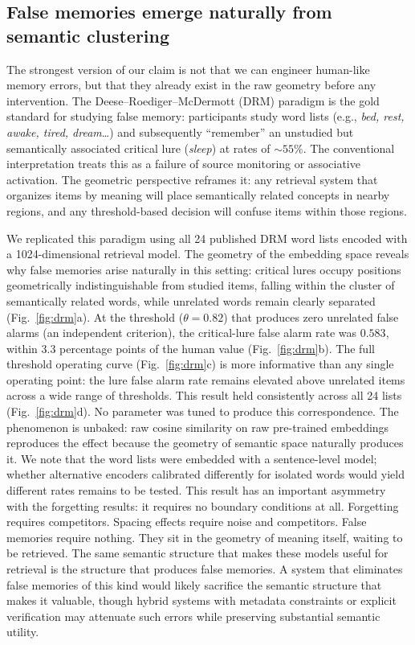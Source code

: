 \documentclass[11pt]{article}
\begin{document}
\subsection*{False memories emerge naturally from semantic clustering}

The strongest version of our claim is not that we can engineer human-like memory errors, but that they already exist in the raw geometry before any intervention. The Deese--Roediger--McDermott (DRM) paradigm\cite{roediger1995} is the gold standard for studying false memory: participants study word lists (e.g., \emph{bed, rest, awake, tired, dream}\ldots) and subsequently ``remember'' an unstudied but semantically associated critical lure (\emph{sleep}) at rates of ${\sim}55\%$. The conventional interpretation treats this as a failure of source monitoring or associative activation. The geometric perspective reframes it: any retrieval system that organizes items by meaning will place semantically related concepts in nearby regions, and any threshold-based decision will confuse items within those regions.

We replicated this paradigm using all 24 published DRM word lists encoded with a 1024-dimensional retrieval model\cite{xiao2023}. The geometry of the embedding space reveals why false memories arise naturally in this setting: critical lures occupy positions geometrically indistinguishable from studied items, falling within the cluster of semantically related words, while unrelated words remain clearly separated (Fig.~\ref{fig:drm}a). At the threshold ($\theta = 0.82$) that produces zero unrelated false alarms (an independent criterion), the critical-lure false alarm rate was $0.583$, within 3.3 percentage points of the human value (Fig.~\ref{fig:drm}b). The full threshold operating curve (Fig.~\ref{fig:drm}c) is more informative than any single operating point: the lure false alarm rate remains elevated above unrelated items across a wide range of thresholds. This result held consistently across all 24 lists (Fig.~\ref{fig:drm}d). No parameter was tuned to produce this correspondence. The phenomenon is unbaked: raw cosine similarity on raw pre-trained embeddings reproduces the effect because the geometry of semantic space naturally produces it. We note that the word lists were embedded with a sentence-level model; whether alternative encoders calibrated differently for isolated words would yield different rates remains to be tested. This result has an important asymmetry with the forgetting results: it requires no boundary conditions at all. Forgetting requires competitors. Spacing effects require noise and competitors. False memories require nothing. They sit in the geometry of meaning itself, waiting to be retrieved. The same semantic structure that makes these models useful for retrieval is the structure that produces false memories. A system that eliminates false memories of this kind would likely sacrifice the semantic structure that makes it valuable, though hybrid systems with metadata constraints or explicit verification may attenuate such errors while preserving substantial semantic utility.
\end{document}
